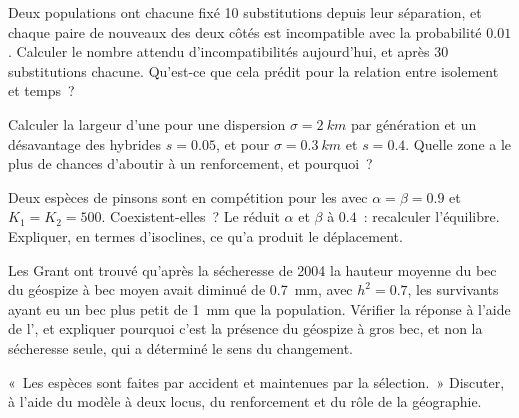 \begin{exercise}[$\star\star$]\label{exo:b2:speciation:8}
Deux populations ont chacune fixé 10 substitutions depuis leur
séparation, et chaque paire de nouveaux  des deux côtés est
incompatible avec la probabilité $0.01$. Calculer le nombre attendu
d'incompatibilités aujourd'hui, et après 30 substitutions chacune.
Qu'est-ce que cela prédit pour la relation entre isolement et temps~?
\end{exercise}

\begin{exercise}[$\star\star$]\label{exo:b2:speciation:9}
Calculer la largeur d'une  pour une dispersion $\sigma =
\qty{2}{km}$ par génération et un désavantage des hybrides $s = 0.05$, et
pour $\sigma = \qty{0.3}{km}$ et $s = 0.4$. Quelle zone a le plus de
chances d'aboutir à un renforcement, et pourquoi~?
\end{exercise}

\begin{exercise}[$\star\star\star$]\label{exo:b2:speciation:10}
Deux espèces de pinsons sont en compétition pour les  avec
$\alpha = \beta = 0.9$ et
$K_1 = K_2 = 500$. Coexistent-elles~? Le  réduit
$\alpha$ et $\beta$ à $0.4$~: recalculer l'équilibre. Expliquer, en
termes d'isoclines, ce qu'a produit le déplacement.
\end{exercise}

\begin{exercise}[$\star\star\star$]\label{exo:b2:speciation:11}
Les Grant ont trouvé qu'après la sécheresse de 2004 la hauteur moyenne
du bec du géospize à bec moyen avait diminué de \qty{0.7}{mm}, avec
$h^{2} = 0.7$, les survivants ayant eu un bec plus petit de \qty{1}{mm}
que la population. Vérifier la réponse à l'aide de l', et expliquer pourquoi c'est la présence du géospize à
gros bec, et non la sécheresse seule, qui a déterminé le sens du
changement.
\end{exercise}

\begin{exercise}[$\star\star\star$]\label{exo:b2:speciation:12}
«~Les espèces sont faites par accident et maintenues par la sélection.~»
Discuter, à l'aide du modèle à deux locus, du renforcement et du rôle de
la géographie.
\end{exercise}

